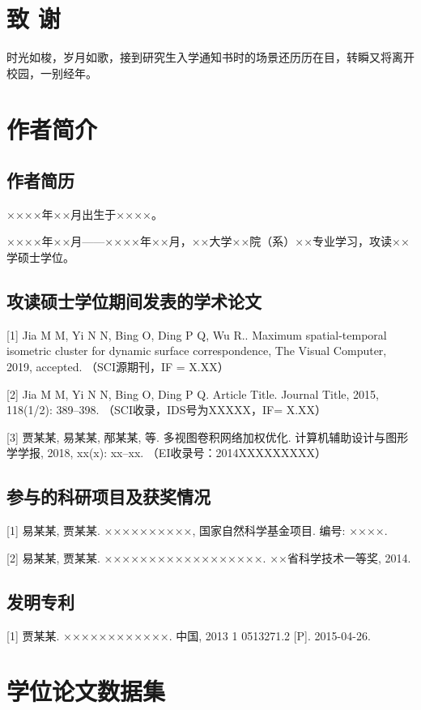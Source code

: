 \documentclass[12pt]{zjutthesis}
\begin{document}
\backmatter



\chapter{致  谢}
时光如梭，岁月如歌，接到研究生入学通知书时的场景还历历在目，转瞬又将离开校园，一别经年。

\chapter{作者简介}
\section{作者简历}
××××年××月出生于××××。

××××年××月——××××年××月，××大学××院（系）××专业学习，攻读××学硕士学位。

\section{攻读硕士学位期间发表的学术论文}
 [1]	Jia M M, Yi N N, Bing O, Ding P Q, Wu R.. Maximum spatial-temporal isometric cluster for dynamic surface correspondence, The Visual Computer, 2019, accepted. （SCI源期刊，IF = X.XX）

[2]	Jia M M, Yi N N, Bing O, Ding P Q. Article Title. Journal Title, 2015, 118(1/2): 389–398. （SCI收录，IDS号为XXXXX，IF= X.XX）

[3]	贾某某, 易某某, 邴某某, 等. 多视图卷积网络加权优化. 计算机辅助设计与图形学学报, 2018, xx(x): xx–xx. （EI收录号：2014XXXXXXXXX）

\section{参与的科研项目及获奖情况}
 [1]	易某某, 贾某某. ××××××××××, 国家自然科学基金项目. 编号: ××××.

[2]	易某某, 贾某某. ××××××××××××××××××. ××省科学技术一等奖, 2014.

\section{发明专利}
 [1]	贾某某. ××××××××××××. 中国, 2013 1 0513271.2 [P]. 2015-04-26.

\chapter{学位论文数据集}
\end{document}
